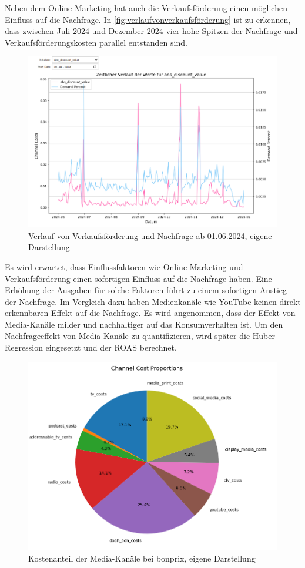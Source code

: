 Neben dem Online-Marketing hat auch die Verkaufsförderung einen möglichen Einfluss auf die Nachfrage. In \autoref{fig:verlaufvonverkaufsförderung} ist zu erkennen, dass zwischen Juli 2024 und Dezember 2024 vier hohe Spitzen der Nachfrage und Verkaufsförderungskosten parallel entstanden sind. 
\begin{figure}[H]
    \centering
    \includegraphics[width=0.8\linewidth]{images/vf_sum.png}
    \caption{Verlauf von Verkaufsförderung und Nachfrage ab 01.06.2024, eigene Darstellung}
    \label{fig:verlaufvonverkaufsförderung}
\end{figure}
Es wird erwartet, dass Einflussfaktoren wie Online-Marketing und Verkaufsförderung einen sofortigen Einfluss auf die Nachfrage haben. Eine Erhöhung der Ausgaben für solche Faktoren führt zu einem sofortigen Anstieg der Nachfrage. Im Vergleich dazu haben Medienkanäle wie YouTube keinen direkt erkennbaren Effekt auf die Nachfrage. Es wird angenommen, dass der Effekt von Media-Kanäle milder und nachhaltiger auf das Konsumverhalten ist. Um den Nachfrageeffekt von Media-Kanäle zu quantifizieren, wird später die Huber-Regression eingesetzt und der \ac{ROAS} berechnet.
\begin{figure}[H]
    \centering
    \includegraphics[width=0.8\linewidth]{images/mediapie.png}
    \caption{Kostenanteil der Media-Kanäle bei bonprix, eigene Darstellung}
    \label{fig:mediapie}
\end{figure}

